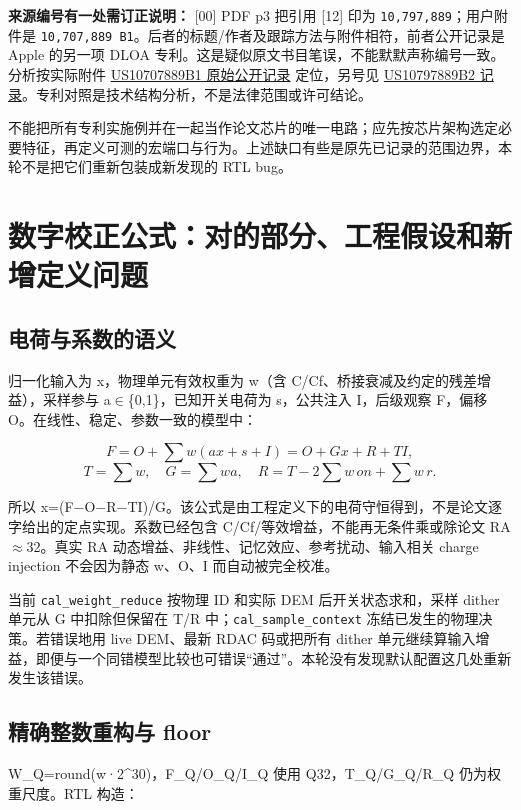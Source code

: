 \documentclass[UTF8,fontset=fandol,10pt,a4paper,openany]{ctexrep}
\newcommand{\code}[1]{\nolinkurl{#1}}
\begin{document}
\textbf{来源编号有一处需订正说明：} [00] PDF p3 把引用 [12] 印为 \code{10,797,889}；用户附件是 \code{10,707,889 B1}。后者的标题/作者及跟踪方法与附件相符，前者公开记录是 Apple 的另一项 DLOA 专利。这是疑似原文书目笔误，不能默默声称编号一致。分析按实际附件 \href{https://patents.google.com/patent/US10707889B1/en}{US10707889B1 原始公开记录} 定位，另号见 \href{https://patents.google.com/patent/US10797889B2/en}{US10797889B2 记录}。专利对照是技术结构分析，不是法律范围或许可结论。


不能把所有专利实施例并在一起当作论文芯片的唯一电路；应先按芯片架构选定必要特征，再定义可测的宏端口与行为。上述缺口有些是原先已记录的范围边界，本轮不是把它们重新包装成新发现的 RTL bug。


\section{数字校正公式：对的部分、工程假设和新增定义问题}


\subsection{电荷与系数的语义}


归一化输入为 x，物理单元有效权重为 w（含 C/Cf、桥接衰减及约定的残差增益），采样参与 a\ensuremath{\in}\{0,1\}，已知开关电荷为 s，公共注入 I，后级观察 F，偏移 O。在线性、稳定、参数一致的模型中：


\[F=O+\sum w(a x+s+I)=O+Gx+R+TI,\]
\[T=\sum w,\quad G=\sum wa,\quad R=T-2\sum w\,on+\sum w\,r.\]


所以 x=(F\ensuremath{-}O\ensuremath{-}R\ensuremath{-}TI)/G。该公式是由工程定义下的电荷守恒得到，不是论文逐字给出的定点实现。系数已经包含 C/Cf/等效增益，不能再无条件乘或除论文 RA\ensuremath{\approx}32。真实 RA 动态增益、非线性、记忆效应、参考扰动、输入相关 charge injection 不会因为静态 w、O、I 而自动被完全校准。


当前 \code{cal_weight_reduce} 按物理 ID 和实际 DEM 后开关状态求和，采样 dither 单元从 G 中扣除但保留在 T/R 中；\code{cal_sample_context} 冻结已发生的物理决策。若错误地用 live DEM、最新 RDAC 码或把所有 dither 单元继续算输入增益，即便与一个同错模型比较也可错误“通过”。本轮没有发现默认配置这几处重新发生该错误。


\subsection{精确整数重构与 floor}


W\_Q=round(w·2\textasciicircum{}30)，F\_Q/O\_Q/I\_Q 使用 Q32，T\_Q/G\_Q/R\_Q 仍为权重尺度。RTL 构造：
\end{document}
